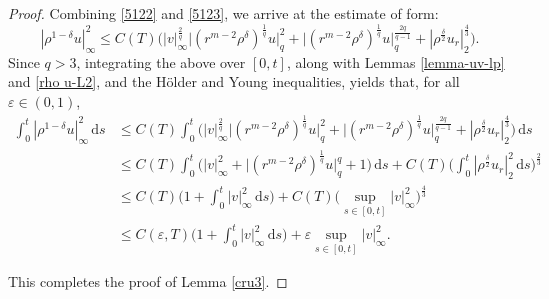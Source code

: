 \documentclass[11pt,reqno]{amsart}
\numberwithin{rk}{section}
\numberwithin{prop}{section}
\numberwithin{mydef}{section}
\numberwithin{lem}{section}
\numberwithin{equation}{section}
\numberwithin{thm}{section}
\begin{document}
\begin{proof}
Combining \eqref{5122} and \eqref{5123}, we arrive at the estimate of form:
\begin{equation*}
|\rho^{1-\delta}u|_\infty^2\leq C(T)\Big(|v|_\infty^\frac{2}{q} \big|(r^{m-2}\rho^\delta)^\frac{1}{q}u\big|_q^2+\big|(r^{m-2}\rho^\delta)^\frac{1}{q}u\big|_q^\frac{2q}{q-1}+ |\rho^\frac{\delta}{2}u_r|_2^{\frac{4}{3}}\Big).
\end{equation*}
Since $q>3$, integrating the above over $[0,t]$, along with Lemmas \ref{lemma-uv-lp} and \ref{rho u-L2}, and the H\"older and Young inequalities, yields that, for all $\varepsilon\in (0,1)$,
\begin{equation*}
\begin{aligned}
\int_0^t |\rho^{1-\delta}u|_\infty^2\,\mathrm{d}s&\leq C(T)\int_0^t\Big(|v|_\infty^\frac{2}{q} \big|(r^{m-2}\rho^\delta)^\frac{1}{q}u\big|_q^2+\big|(r^{m-2}\rho^\delta)^\frac{1}{q}u\big|_q^\frac{2q}{q-1}+ |\rho^\frac{\delta}{2}u_r|_2^{\frac{4}{3}}\Big)\,\mathrm{d}s\\
&\leq C(T)\int_0^t \big(|v|_\infty^2 +\big|(r^{m-2}\rho^\delta)^\frac{1}{q}u\big|_q^q+1\big)\,\mathrm{d}s +C(T)\Big(\int_0^t |\rho^\frac{\delta}{2}u_r|_2^{2} \,\mathrm{d}s\Big)^\frac{2}{3}\\
&\leq C(T)\Big(1+ \int_0^t |v|_\infty^2\,\mathrm{d}s\Big)+C(T)\Big(\sup_{s\in[0,t]}|v|_\infty^2\Big)^\frac{4}{3}\\
&\leq C(\varepsilon,T)\Big(1+ \int_0^t |v|_\infty^2\,\mathrm{d}s\Big)+\varepsilon \sup_{s\in[0,t]}|v|_\infty^2.
\end{aligned}
\end{equation*}

This completes the proof of Lemma \ref{cru3}.
\end{proof}
\end{document}
